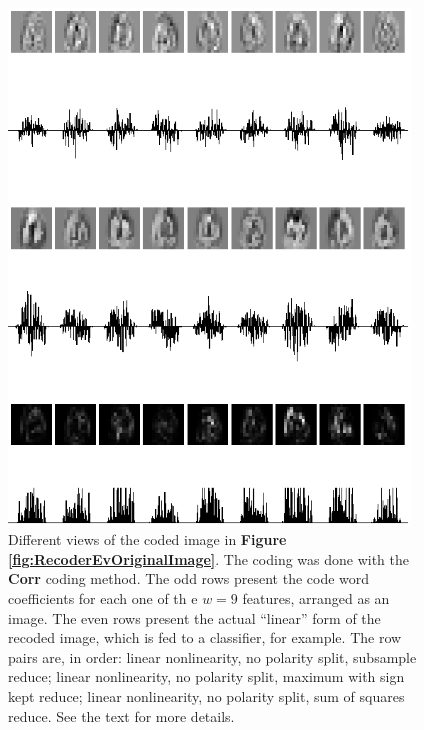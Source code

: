 \documentclass[12pt,a4paper,oneside,english]{UPBThesis}
\begin{document}
\begin{figure}
\centering
\includegraphics[width=0.95\textwidth,height=0.8\textheight]{thesis_data/recoderev/coded_partial_corr.png}
\caption{Different views of the coded image in \textbf{Figure \ref{fig:RecoderEvOriginalImage}}. The coding was done with the \textbf{Corr} coding method. The odd rows present the code word coefficients for each one of th e $w=9$ features, arranged as an image. The even rows present the actual ``linear'' form of the recoded image, which is fed to a classifier, for example. The row pairs are, in order: linear nonlinearity, no polarity split, subsample reduce; linear nonlinearity, no polarity split, maximum with sign kept reduce; linear nonlinearity, no polarity split, sum of squares reduce. See the text for more details.}
\label{fig:RecoderEvRecodingExamplesCorr}
\end{figure}
\end{document}
